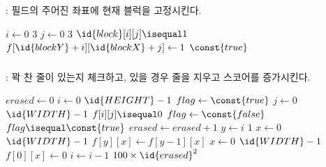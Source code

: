 \subsubsection{}: 필드의 주어진 좌표에 현재 블럭을 고정시킨다.

\begin{codebox}
\li \For $i \gets 0$ \To $3$
\li \Do
        \For $j \gets 0$ \To $3$
\li     \Do
            \If $\id{block}[i][j] \isequal 1$
\li         \Then
                $f[\id{blockY} + i][\id{blockX} + j] \gets 1$
            \End
        \End
    \End
\li \Return $\const{true}$
\end{codebox}

\newpage

\subsubsection{}: 꽉 찬 줄이 있는지 체크하고, 있을 경우 줄을 지우고 스코어를 증가시킨다.

\begin{codebox}
\li $erased \gets 0$
\li \For $i \gets 0$ \To $\id{HEIGHT} - 1$
\li \Do
        $flag \gets \const{true}$
\li     \For $j \gets 0$ \To $\id{WIDTH} - 1$
\li     \Do
            \If $f[i][j] \isequal 0$
\li         \Then
                $flag \gets \const{false}$
            \End
        \End
\li     \If $flag \isequal \const{true}$
            \Then
\li             $erased \gets erased + 1$
\li             \For $y \gets i$ \Downto $1$
\li             \Do
                    \For $x \gets 0$ \To $\id{WIDTH} - 1$
\li                 \Do
                        $f[y][x] \gets f[y - 1][x]$
                    \End
                \End
\li             \For $x \gets 0$ \To $\id{WIDTH} - 1$
\li             \Do
                    $f[0][x] \gets 0$
                \End
\li             $i \gets i - 1$
            \End
        \End
    \End
\li \Return $100 \times \id{erased}^2$
\end{codebox}



